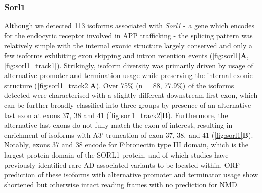 \subsubsection{Sorl1}
Although we detected 113 isoforms associated with \textit{Sorl1} - a gene which encodes for the endocytic receptor involved in APP trafficking - the splicing pattern was relatively simple with the internal exonic structure largely conserved and only a few isoforms exhibiting exon skipping and intron retention events (\cref{fig:sorl1}\textbf{A}, \cref{fig:sorl1_track1}). Strikingly, isoform diversity was primarily driven by usage of alternative promoter and termination usage while preserving the internal exonic structure (\cref{fig:sorl1_track2}\textbf{A}). Over 75\% (n = 88, 77.9\%) of the isoforms detected were characterised with a slightly different downstream first exon, which can be further broadly classified into three groups by presence of an alternative last exon at exons 37, 38 and 41 (\cref{fig:sorl1_track2}\textbf{B}). Furthermore, the alternative last exons do not fully match the exon of interest, resulting in enrichment of isoforms with A3' truncation of exon 37, 38, and 41 (\cref{fig:sorl1}\textbf{B}). Notably, exons 37 and 38 encode for Fibronectin type III domain, which is the largest protein domain of the SORL1 protein, and of which studies have previously identified rare AD-associated variants to be located within\cite{Verheijen2016}. ORF prediction of these isoforms with alternative promoter and terminator usage show shortened but otherwise intact reading frames with no prediction for NMD. 

